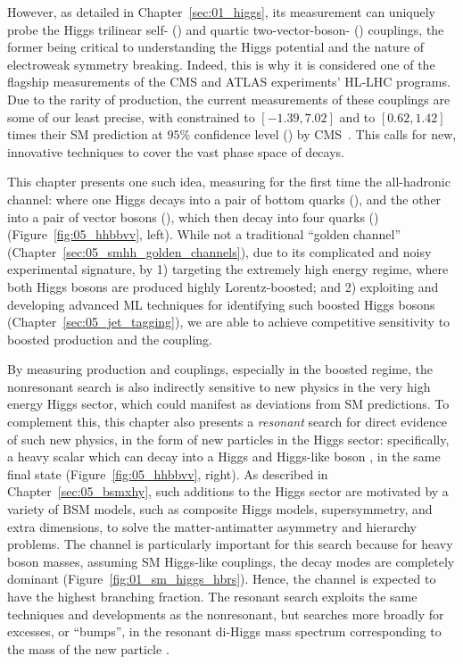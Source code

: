 However, as detailed in Chapter~\ref{sec:01_higgs}, its measurement can uniquely probe the Higgs trilinear self- (\cl) and quartic two-vector-boson- (\cvv) couplings, the former being critical to understanding the Higgs potential and the nature of electroweak symmetry breaking.
Indeed, this is why it is considered one of the flagship measurements of the CMS and ATLAS experiments' HL-LHC programs.
Due to the rarity of \HH production, the current measurements of these couplings are some of our least precise, with \cl constrained to $[-1.39, 7.02]$ and \cvv to $[0.62, 1.42]$ times their SM prediction at $95\%$ confidence level (\CL) by CMS~\cite{CMS-PAS-HIG-20-011}.
This calls for new, innovative techniques to cover the vast phase space of \HH decays.

This chapter presents one such idea, measuring for the first time the all-hadronic \HHbbVV channel: where one Higgs decays into a pair of bottom quarks (\bbbar), and the other into a pair of vector bosons (\VV), which then decay into four quarks (\qqqq) (Figure~\ref{fig:05_hhbbvv}, left).
While not a traditional ``golden channel'' (Chapter~\ref{sec:05_smhh_golden_channels}), due to its complicated and noisy experimental signature, by 1) targeting the extremely high energy \HH regime, where both Higgs bosons are produced highly Lorentz-boosted; and 2) exploiting and developing advanced ML techniques for identifying such boosted Higgs bosons (Chapter~\ref{sec:05_jet_tagging}), we are able to achieve competitive sensitivity to boosted \HH production and the \cvv coupling.

By measuring \HH production and couplings, especially in the boosted regime, the nonresonant search is also indirectly sensitive to new physics in the very high energy Higgs sector, which could manifest as deviations from SM predictions.
To complement this, this chapter also presents a \textit{resonant} search for direct evidence of such new physics, in the form of new particles in the Higgs sector: specifically, a heavy scalar \PX which can decay into a Higgs and Higgs-like boson \PY, in the same final state (Figure~\ref{fig:05_hhbbvv}, right).
As described in Chapter~\ref{sec:05_bsmxhy}, such additions to the Higgs sector are motivated by a variety of BSM models, such as composite Higgs models, supersymmetry, and extra dimensions, to solve the matter-antimatter asymmetry and hierarchy problems.
The \bbvv channel is particularly important for this search because for heavy \PY boson masses, assuming SM Higgs-like couplings, the \yvv decay modes are completely dominant (Figure~\ref{fig:01_sm_higgs_hbrs}).
Hence, the \bbvv channel is expected to have the highest branching fraction.
The resonant search exploits the same techniques and developments as the nonresonant, but searches more broadly for excesses, or ``bumps'', in the resonant di-Higgs mass spectrum corresponding to the mass of the new particle \PX.


